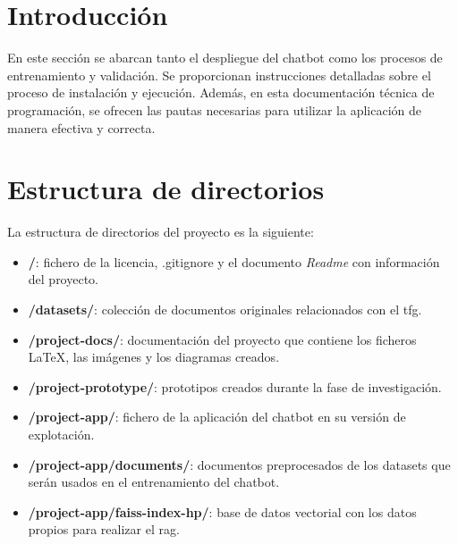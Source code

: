 
\section{Introducción}

En este sección se abarcan tanto el despliegue del chatbot como los procesos de entrenamiento y validación. Se proporcionan instrucciones detalladas sobre el proceso de instalación y ejecución. Además, en esta documentación técnica de programación, se ofrecen las pautas necesarias para utilizar la aplicación de manera efectiva y correcta.

\section{Estructura de directorios}

La estructura de directorios del proyecto es la siguiente:

\begin{itemize}

    \item \textbf{/}: fichero de la licencia, .gitignore y el documento \textit{Readme} con información del proyecto.
    
    \item \textbf{/datasets/}: colección de documentos originales relacionados con el \acrshort{tfg}.
    
    \item \textbf{/project-docs/}: documentación del proyecto que contiene los ficheros \LaTeX, las imágenes y los diagramas creados.
    
    \item \textbf{/project-prototype/}: prototipos creados durante la fase de investigación.
    
    \item \textbf{/project-app/}: fichero de la aplicación del chatbot en su versión de explotación.
    
    \item \textbf{/project-app/documents/}: documentos preprocesados de los datasets que serán usados en el entrenamiento del chatbot.
    
    \item \textbf{/project-app/faiss-index-hp/}: base de datos vectorial con los datos propios para realizar el \acrshort{rag}.
    
\end{itemize}

